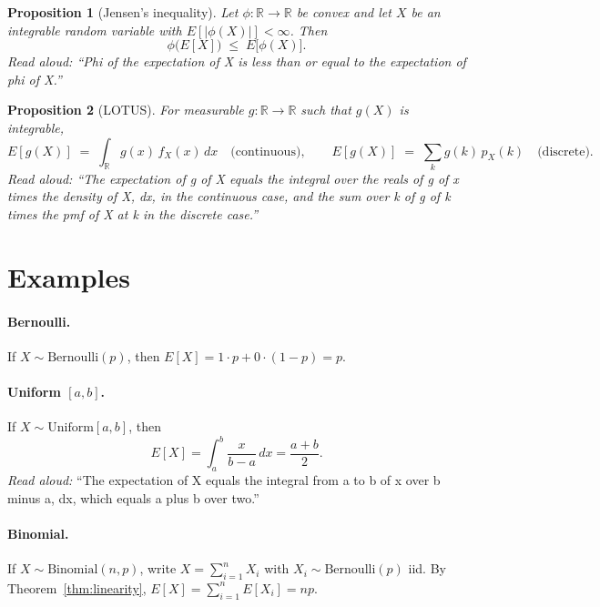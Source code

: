 \documentclass[11pt]{article}
\newtheorem{proposition}{Proposition}
\begin{document}
\begin{proposition}[Jensen's inequality]
Let $\phi : \mathbb{R} \to \mathbb{R}$ be convex and let $X$ be an integrable
random variable with $E[|\phi(X)|] < \infty$. Then
\[
\phi\!\big(E[X]\big) \;\le\; E\!\big[\phi(X)\big].
\]
\emph{Read aloud:} ``Phi of the expectation of X is less than or equal to the expectation of phi of X.''
\end{proposition}

\begin{proposition}[LOTUS]
For measurable $g : \mathbb{R} \to \mathbb{R}$ such that $g(X)$ is integrable,
\[
E[g(X)] \;=\; \int_{\mathbb{R}} g(x)\, f_X(x)\, dx
\quad \text{(continuous)},
\qquad
E[g(X)] \;=\; \sum_{k} g(k)\, p_X(k)
\quad \text{(discrete)}.
\]
\emph{Read aloud:} ``The expectation of g of X equals the integral over the reals of g of x times the density of X, dx, in the continuous case, and the sum over k of g of k times the pmf of X at k in the discrete case.''
\end{proposition}

\section{Examples}

\paragraph{Bernoulli.} If $X \sim \mathrm{Bernoulli}(p)$, then
$E[X] = 1 \cdot p + 0 \cdot (1-p) = p$.

\paragraph{Uniform $[a,b]$.} If $X \sim \mathrm{Uniform}[a,b]$, then
\[
E[X] = \int_a^b \frac{x}{b-a}\, dx = \frac{a+b}{2}.
\]
\emph{Read aloud:} ``The expectation of X equals the integral from a to b of x over b minus a, dx, which equals a plus b over two.''

\paragraph{Binomial.} If $X \sim \mathrm{Binomial}(n, p)$, write
$X = \sum_{i=1}^{n} X_i$ with $X_i \sim \mathrm{Bernoulli}(p)$ iid. By
Theorem~\ref{thm:linearity}, $E[X] = \sum_{i=1}^{n} E[X_i] = np$.
\end{document}
